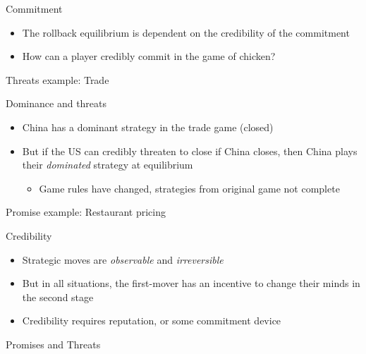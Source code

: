 \documentclass[10pt]{beamer}
\begin{document}
\begin{frame}[label={sec:org24c39ca}]{}
\alert{Commitment} 
\begin{itemize}
\item The rollback equilibrium is dependent on the credibility of the commitment
\item How can a player credibly commit in the game of chicken?
\end{itemize}
\end{frame}

\begin{frame}[label={sec:org4deec37}]{Threats example: Trade}
\end{frame}

\begin{frame}[label={sec:orgead16af}]{}
\alert{Dominance and threats}
\begin{itemize}
\item China has a dominant strategy in the trade game (closed)
\item But if the US can credibly threaten to close if China closes, then China plays their \emph{dominated} strategy at equilibrium
\begin{itemize}
\item Game rules have changed, strategies from original game not complete
\end{itemize}
\end{itemize}
\end{frame}

\begin{frame}[label={sec:orgb8302c1}]{Promise example: Restaurant pricing}
\end{frame}

\begin{frame}[label={sec:org8a8ce64}]{}
\alert{Credibility}
\begin{itemize}
\item Strategic moves are \emph{observable} and \emph{irreversible}
\item But in all situations, the first-mover has an incentive to change their minds in the second stage
\item Credibility requires reputation, or some commitment device
\end{itemize}
\end{frame}

\begin{frame}[label={sec:orga1f5e6a}]{Promises and Threats}
\end{frame}
\end{document}

